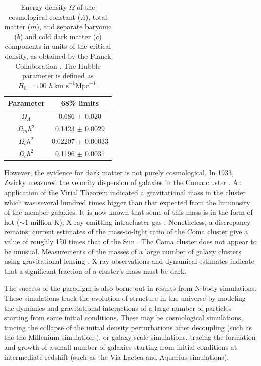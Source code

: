 \begin{table}

  \begin{center}
	\begin{tabular}{cc}
        \hline\hline
        Parameter & 68\% limits \\
        \hline
        $\Omega_\Lambda$ & 0.686 $\pm$ 0.020 \\
        $\Omega_m h^2$ & 0.1423 $\pm$ 0.0029 \\
        $\Omega_b h^2$ & 0.02207 $\pm$ 0.00033 \\
        $\Omega_c h^2$ & 0.1196 $\pm$ 0.0031 \\
        \hline\hline
	\end{tabular}
  \end{center}
  \caption[Cosmological parameters obtained by the Planck Collaboration]{Energy density $\Omega$ of the cosmological constant ($\Lambda$), total matter ($m$), and separate baryonic ($b$) and cold dark matter ($c$) components in units of the critical density, as obtained by the Planck Collaboration \cite{PlanckXVI:2013}. The Hubble parameter is defined as $H_0 = 100 \,\,h \, \textrm{km s}^{-1} \textrm{Mpc}^{-1}$.}
  \label{tab:intro:Planck}
\end{table}

However, the evidence for dark matter is not purely cosmological. In 1933, Zwicky measured the velocity dispersion of galaxies in the Coma cluster \cite{Zwicky:1933}. An application of the Virial Theorem indicated a gravitational mass in the cluster which was several hundred times bigger than that expected from the luminosity of the member galaxies. It is now known that some of this mass is in the form of hot ($\sim$1 million K), X-ray emitting intracluster gas \cite{Sanders:2013}. Nonetheless, a discrepancy remains; current estimates of the mass-to-light ratio of the Coma cluster give a value of roughly 150 times that of the Sun \cite{Fusco-Femiano:1994,Makino:1994}. The Coma cluster does not appear to be unusual. Measurements of the masses of a large number of galaxy clusters using gravitational lensing \cite{Okabe:2013}, X-ray observations \cite{Ettori:2013} and dynamical estimates \cite{Carlberg:1995} indicate that a significant fraction of a cluster's mass must be dark.

The success of the \LCDM paradigm is also borne out in results from N-body simulations. These simulations track the evolution of structure in the universe by modeling the dynamics and gravitational interactions of a large number of particles starting from some initial conditions. These may be cosmological simulations, tracing the collapse of the initial density perturbations after decoupling (such as the the Millenium simulation \cite{Springel:2005}), or galaxy-scale simulations, tracing the formation and growth of a small number of galaxies starting from initial conditions at intermediate redshift (such as the Via Lactea \cite{Diemand:2006} and Aquarius \cite{Springel:2008} simulations).

